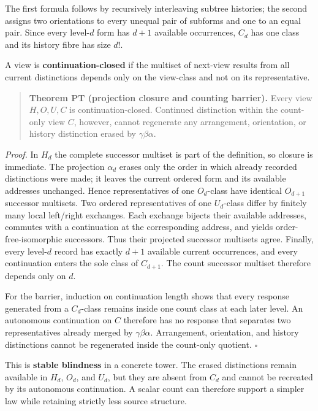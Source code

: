 \documentclass[11pt,a4paper]{article}
\begin{document}
The first formula follows by recursively interleaving subtree histories;
the second assigns two orientations to every unequal pair of subforms
and one to an equal pair. Since every level-\(d\) form has \(d + 1\)
available occurrences, \(C_{d}\) has one class and its history fibre has
size \(d!\).

A view is \textbf{continuation-closed} if the multiset of next-view
results from all current distinctions depends only on the view-class and
not on its representative.

\begin{quote}
\textbf{Theorem PT (projection closure and counting barrier).} Every
view \(H,O,U,C\) is continuation-closed. Continued distinction within
the count-only view \(C\), however, cannot regenerate any arrangement,
orientation, or history distinction erased by \(\gamma\beta\alpha\).
\end{quote}

\emph{Proof.} In \(H_{d}\) the complete successor multiset is part of
the definition, so closure is immediate. The projection \(\alpha_{d}\)
erases only the order in which already recorded distinctions were made;
it leaves the current ordered form and its available addresses
unchanged. Hence representatives of one \(O_{d}\)-class have identical
\(O_{d + 1}\) successor multisets. Two ordered representatives of one
\(U_{d}\)-class differ by finitely many local left/right exchanges. Each
exchange bijects their available addresses, commutes with a continuation
at the corresponding address, and yields order-free-isomorphic
successors. Thus their projected successor multisets agree. Finally,
every level-\(d\) record has exactly \(d + 1\) available current
occurrences, and every continuation enters the sole class of
\(C_{d + 1}\). The count successor multiset therefore depends only on
\(d\).

For the barrier, induction on continuation length shows that every
response generated from a \(C_{d}\)-class remains inside one count class
at each later level. An autonomous continuation on \(C\) therefore has
no response that separates two representatives already merged by
\(\gamma\beta\alpha\). Arrangement, orientation, and history
distinctions cannot be regenerated inside the count-only quotient. \(\ensuremath{\square}\)

This is \textbf{stable blindness} in a concrete tower. The erased
distinctions remain available in \(H_{d}\), \(O_{d}\), and \(U_{d}\),
but they are absent from \(C_{d}\) and cannot be recreated by its
autonomous continuation. A scalar count can therefore support a simpler
law while retaining strictly less source structure.
\end{document}
